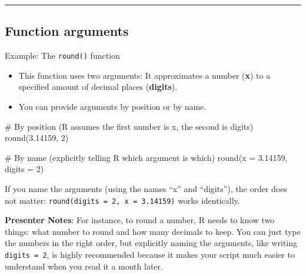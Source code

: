 \documentclass[
  letterpaper,
  DIV=11,
  numbers=noendperiod]{scrartcl}
\newenvironment{Shaded}{\begin{snugshade}}{\end{snugshade}}
\newcommand{\AttributeTok}[1]{\textcolor[rgb]{0.40,0.45,0.13}{#1}}
\newcommand{\CommentTok}[1]{\textcolor[rgb]{0.37,0.37,0.37}{#1}}
\newcommand{\DecValTok}[1]{\textcolor[rgb]{0.68,0.00,0.00}{#1}}
\newcommand{\FloatTok}[1]{\textcolor[rgb]{0.68,0.00,0.00}{#1}}
\newcommand{\FunctionTok}[1]{\textcolor[rgb]{0.28,0.35,0.67}{#1}}
\newcommand{\NormalTok}[1]{\textcolor[rgb]{0.00,0.23,0.31}{#1}}
\providecommand{\tightlist}{%
  \setlength{\itemsep}{0pt}\setlength{\parskip}{0pt}}
\begin{document}
\begin{center}\rule{0.5\linewidth}{0.5pt}\end{center}

\subsection{Function arguments}\label{function-arguments-1}

Example: The \texttt{round()} function

\begin{itemize}
\tightlist
\item
  This function uses two arguments: It approximates a number
  (\textbf{x}) to a specified amount of decimal places
  (\textbf{digits}).
\item
  You can provide arguments by position or by name.
\end{itemize}

\begin{Shaded}
\begin{Highlighting}[]
\CommentTok{\# By position (R assumes the first number is x, the second is digits)}
\FunctionTok{round}\NormalTok{(}\FloatTok{3.14159}\NormalTok{, }\DecValTok{2}\NormalTok{)}

\CommentTok{\# By name (explicitly telling R which argument is which)}
\FunctionTok{round}\NormalTok{(}\AttributeTok{x =} \FloatTok{3.14159}\NormalTok{, }\AttributeTok{digits =} \DecValTok{2}\NormalTok{)}
\end{Highlighting}
\end{Shaded}

\begin{tcolorbox}[enhanced jigsaw, arc=.35mm, bottomrule=.15mm, bottomtitle=1mm, breakable, colback=white, colbacktitle=quarto-callout-tip-color!10!white, colframe=quarto-callout-tip-color-frame, coltitle=black, left=2mm, leftrule=.75mm, opacityback=0, opacitybacktitle=0.6, rightrule=.15mm, title=\textcolor{quarto-callout-tip-color}{\faLightbulb}\hspace{0.5em}{Naming your arguments makes your code easier to read!}, titlerule=0mm, toprule=.15mm, toptitle=1mm]

If you name the arguments (using the names ``x'' and ``digits''), the
order does not matter: \texttt{round(digits\ =\ 2,\ x\ =\ 3.14159)}
works identically.

\end{tcolorbox}

\textbf{Presenter Notes}: For instance, to round a number, R needs to
know two things: what number to round and how many decimals to keep. You
can just type the numbers in the right order, but explicitly naming the
arguments, like writing \texttt{digits\ =\ 2}, is highly recommended
because it makes your script much easier to understand when you read it
a month later.
\end{document}
